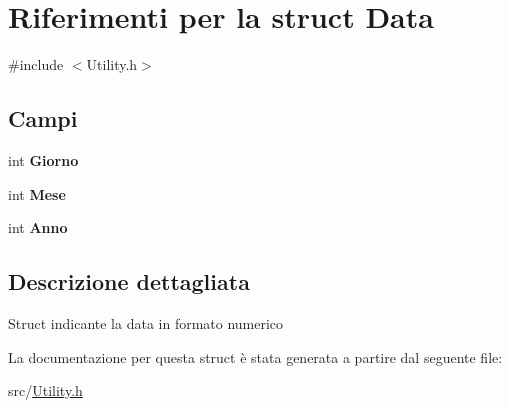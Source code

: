 \hypertarget{struct_data}{}\section{Riferimenti per la struct Data}
\label{struct_data}


{\ttfamily \#include $<$Utility.\+h$>$}

\subsection*{Campi}
\begin{DoxyCompactItemize}
\item 
\mbox{\label{struct_data_aca78d84e5a85c27ebc1b547f4ab30670}} 
int {\bfseries Giorno}
\item 
\mbox{\label{struct_data_a3d7c966e53c81efc6001c04e223cd78d}} 
int {\bfseries Mese}
\item 
\mbox{\label{struct_data_a6dcce3e372f2470ab42cf25bea888a24}} 
int {\bfseries Anno}
\end{DoxyCompactItemize}


\subsection{Descrizione dettagliata}
Struct indicante la data in formato numerico 

La documentazione per questa struct è stata generata a partire dal seguente file\+:\begin{DoxyCompactItemize}
\item 
src/\hyperlink{_utility_8h}{Utility.\+h}\end{DoxyCompactItemize}
